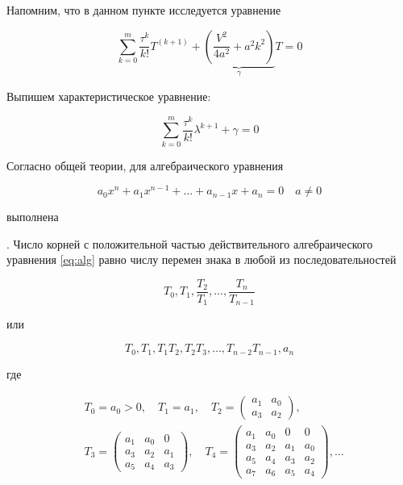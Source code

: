 Напомним, что в данном пункте исследуется уравнение 

\begin{equation*}
\sum\limits_{k=0}^{m} \dfrac{\tau^k}{k!} T^{(k+1)} + \underbrace{ \left( \dfrac{V^2}{4a^2} + a^2 k^2 \right)}_{\gamma} T = 0
\end{equation*}

Выпишем характеристическое уравнение:

\begin{equation*}
\sum\limits_{k=0}^{m} \dfrac{\tau^k}{k!} \lambda^{k+1} + {\gamma} = 0
\end{equation*}

Согласно общей теории, для алгебраического уравнения

\begin{equation}\label{eq:alg}
a_0 x^n + a_1 x^{n-1} + \dots + a_{n-1} x + a_n = 0 \quad a \neq 0
\end{equation}

выполнена

. Число корней с положительной частью действительного алгебраического уравнения \ref{eq:alg} равно числу перемен знака в любой из последовательностей

\begin{equation*}
T_0, T_1, \dfrac{T_2}{T_1}, \dots, \dfrac{T_n}{T_{n-1}}
\end{equation*}

или

\begin{equation*}
T_0, T_1, T_1 T_2, T_2 T_3, \dots, T_{n-2} T_{n-1}, a_n
\end{equation*}

где 

\begin{align*}
& T_0 = a_0 > 0, \quad T_1 = a_1, \quad T_2 = 
\begin{pmatrix}
a_1 & a_0\\
a_3 & a_2
\end{pmatrix},\\
& T_3 = 
\begin{pmatrix}
a_1 & a_0 & 0\\
a_3 & a_2 &a_1\\
a_5 & a_4 &a_3
\end{pmatrix}, \quad T_4 =
\begin{pmatrix}
a_1 & a_0 & 0 & 0\\
a_3 & a_2 & a_1 & a_0\\
a_5 & a_4 & a_3 & a_2\\
a_7 & a_6 & a_5 & a_4
\end{pmatrix}, \dots
\end{align*}

